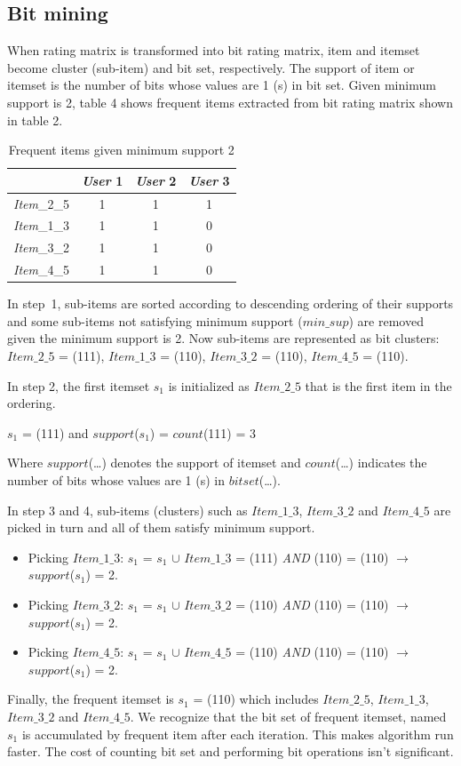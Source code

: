 \documentclass[10pt]{article}
\begin{document}
\subsection{Bit mining} \label{subsection:bit.mining}
When rating matrix is transformed into bit rating matrix, item and itemset become cluster (sub-item) and bit set, respectively. The support of item or itemset is the number of bits whose values are 1 (s) in bit set. Given minimum support is 2, table 4 shows frequent items extracted from bit rating matrix shown in table 2.
\begin{table}
\centering
\caption{Frequent items given minimum support 2}
\begin{tabular}{|l|c|c|c|} \hline
&\textit{User} 1&\textit{User} 2&\textit{User} 3\\ \hline
\textit{Item}\_2\_5&1&1&1\\ \hline
\textit{Item}\_1\_3&1&1&0\\ \hline
\textit{Item}\_3\_2&1&1&0\\ \hline
\textit{Item}\_4\_5&1&1&0\\ \hline
\end{tabular}
\label{table:frequent.items}
\end{table}

In step~1, sub-items are sorted according to descending ordering of their supports and some sub-items not satisfying minimum support ($min\_sup$) are removed given the minimum support is 2. Now sub-items are represented as bit clusters: $Item\_2\_5$ = (111), $Item\_1\_3$ = (110), $Item\_3\_2$ = (110), $Item\_4\_5$ = (110).

In step 2, the first itemset $s_1$ is initialized as $Item\_2\_5$ that is the first item in the ordering.
\begin{center}
$s_1$ = (111) and $support$($s_1$) = $count$(111) = 3
\end{center}
Where $support$(\ldots) denotes the support of itemset and $count$(\ldots) indicates the number of bits whose values are 1 (s) in $bitset$(\ldots).

In step 3 and 4, sub-items (clusters) such as $Item\_1\_3$, $Item\_3\_2$ and $Item\_4\_5$ are picked in turn and all of them satisfy minimum support.
\begin{itemize}
\item Picking $Item\_1\_3$: $s_1$ = $s_1$ $\cup$ {$Item\_1\_3$} = (111) \textit{AND} (110) = (110) $\rightarrow$ $support$($s_1$) = 2.
\item Picking $Item\_3\_2$: $s_1$ = $s_1$ $\cup$ {$Item\_3\_2$} = (110) \textit{AND} (110) = (110) $\rightarrow$ $support$($s_1$) = 2.
\item Picking $Item\_4\_5$: $s_1$ = $s_1$ $\cup$ {$Item\_4\_5$} = (110) \textit{AND} (110) = (110) $\rightarrow$ $support$($s_1$) = 2.
\end{itemize}
Finally, the frequent itemset is $s_1$ = (110) which includes $Item\_2\_5$, $Item\_1\_3$, $Item\_3\_2$ and $Item\_4\_5$. We recognize that the bit set of frequent itemset, named $s_1$ is accumulated by frequent item after each iteration. This makes algorithm run faster. The cost of counting bit set and performing bit operations isn't significant.
\end{document}
